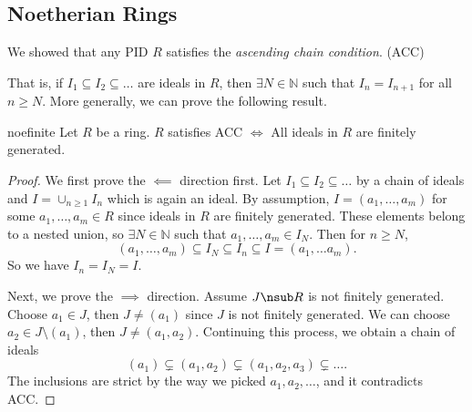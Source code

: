 \subsection{Noetherian Rings}
We showed that any PID \(R\) satisfies the \textit{ascending chain condition}. (ACC)

That is, if \(I_1 \subseteq I_2 \subseteq \dots\) are ideals in \(R\), then \(\exists N \in \mathbb{N}\) such that \(I_n = I_{n+1}\) for all \(n \geq N\). More generally, we can prove the following result.
\begin{lemma}{}{noefinite}
    Let \(R\) be a ring. \(R\) satisfies ACC \(\iff\) All ideals in \(R\) are finitely generated.
\end{lemma}
\begin{proof}
    We first prove the \(\impliedby\) direction first. Let \(I_1 \subseteq I_2 \subseteq \dots\) by a chain of ideals and \(I = \cup_{n\geq 1} I_n\) which is again an ideal. By assumption, \(I = (a_1, \dots, a_m)\) for some \(a_1, \dots, a_m \in R\) since ideals in \(R\) are finitely generated. These elements belong to a nested union, so \(\exists N \in \mathbb{N}\) such that \(a_1, \dots, a_m \in I_N\). Then for \(n \geq N\),
    \[
        (a_1, \dots, a_m) \subseteq I_N \subseteq I_n \subseteq I = (a_1,\dots a_m).
    \]
    So we have \(I_n = I_N = I\).

    Next, we prove the \(\implies\) direction. Assume \(J \nsub R\) is not finitely generated. Choose \(a_1 \in J\), then \(J \neq (a_1)\) since \(J\) is not finitely generated. We can choose \(a_2 \in J \setminus (a_1)\), then \(J \neq (a_1, a_2)\). Continuing this process, we obtain a chain of ideals
    \[
        (a_1) \subsetneq (a_1, a_2) \subsetneq (a_1, a_2, a_3) \subsetneq \dots.
    \]
    The inclusions are strict by the way we picked \(a_1, a_2, \dots\), and it contradicts ACC.
\end{proof}